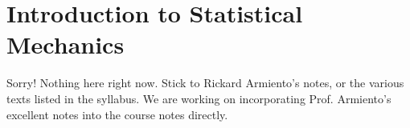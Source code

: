\documentclass[12pt]{article}
\begin{document}
\section{Introduction to Statistical Mechanics}
Sorry! Nothing here right now. Stick to Rickard Armiento's notes, or the various texts listed in the syllabus. We are working on incorporating Prof. Armiento's excellent notes into the course notes directly.
%
%
\end{document}
